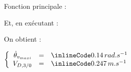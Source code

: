 \begin{enumerate}
        Fonction principale :

        Et, en exécutant :

        On obtient :
        \begin{result}
          $
            \left\{
            \begin{array}{rcl}
              \dot{\theta}_{v_{maxi}} & = & \il{0.14} \thinspace rad.s^{-1} \\
              V_{D, 3/0}              & = & \il{0.247} \thinspace m.s^{-1}  \\
            \end{array}
            \right.
          $
        \end{result}
\end{enumerate}
